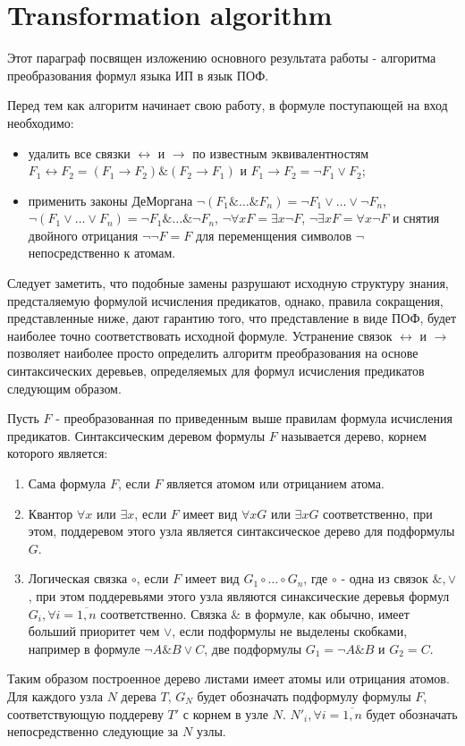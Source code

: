 \documentclass[a4paper,12pt]{article}
\begin{document}
\section{Transformation algorithm}

Этот параграф посвящен изложению основного результата работы - алгоритма преобразования формул языка ИП в язык ПОФ.

Перед тем как алгоритм начинает свою работу, в формуле поступающей на вход необходимо:
\begin{itemize}
\item удалить все связки $\leftrightarrow$ и $\rightarrow$ по известным эквивалентностям $F_1\leftrightarrow F_2 = (F_1\rightarrow F_2)\&(F_2\rightarrow F_1)$ и $F_1\rightarrow F_2 = \neg F_1 \vee F_2$;
\item применить законы ДеМоргана $\neg (F_1\&\ldots\& F_n)=\neg F_1\vee\ldots\vee\neg F_n$, $\neg (F_1\vee\ldots\vee F_n)=\neg F_1\&\ldots\&\neg F_n$, $\neg\forall x F = \exists x \neg F$, $\neg\exists x F = \forall x \neg F$  и снятия двойного отрицания $\neg\neg F = F$ для переменщения символов $\neg$ непосредственно к атомам.
\end{itemize}
Следует заметить, что подобные замены разрушают исходную структуру знания, предсталяемую формулой исчисления предикатов, однако, правила сокращения, представленные ниже, дают гарантию того, что представление в виде ПОФ, будет наиболее точно соответствовать исходной формуле. Устранение связок  $\leftrightarrow$ и $\rightarrow$ позволяет наиболее просто определить алгоритм преобразования на основе синтаксических деревьев, определяемых для формул исчисления предикатов следующим образом.

Пусть $F$ - преобразованная по приведенным выше правилам формула исчисления предикатов. Синтаксическим деревом формулы $F$ называется дерево, корнем которого является:
\begin{enumerate}
\item Сама формула $F$, если $F$ является атомом или отрицанием атома.
\item Квантор $\forall x$ или $\exists x$, если $F$ имеет вид $\forall x G$ или $\exists x G$ соответственно, при этом, поддеревом этого узла является  синтаксическое дерево для подформулы $G$.
\item Логическая связка $\circ$, если $F$ имеет вид $G_1\circ\ldots\circ G_n$, где $\circ$ - одна из связок $\&,\vee$, при этом поддеревьями этого узла являются синаксические деревья формул $G_i, \forall i=\overline{1,n}$ соответственно. Связка $\&$ в формуле, как обычно, имеет больший приоритет чем $\vee$, если подформулы не выделены скобками, например в формуле $\neg A \& B \vee C$, две подформулы $G_1 = \neg A\& B$ и $G_2 = C$.
\end{enumerate}
Таким образом построенное дерево листами имеет атомы или отрицания атомов. Для каждого узла $N$ дерева $T$, $G_N$ будет обозначать подформулу формулы $F$, соответствующую поддереву $T'$ с корнем в узле $N$. $N'_i,\forall i=\overline{1,n}$ будет обозначать непосредственно следующие за $N$ узлы.
\end{document}
